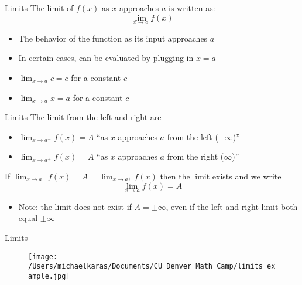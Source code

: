 \documentclass[aspectratio=169]{beamer}
\begin{document}
\begin{frame}{Limits}\label{main1}
	The limit of \( f(x) \) as \( x \) approaches \( a \) is written as:
\[
\lim_{x \to a} f(x)
\]
\begin{itemize}
\begin{itemize}
	\item The behavior of the function as its input approaches \( a \)
	\item In certain cases, can be evaluated by plugging in \( x = a \)
	\item \( \lim_{x \to a} c = c \) for a constant \( c \)
	\item \(\lim_{x \to a} x = a \) for a constant \( c \)
\end{itemize}
\end{itemize}

\end{frame}

\begin{frame}{Limits}\label{main1}
The limit from the left and right are
\begin{itemize}
\begin{itemize}
    \item \(\lim_{x \to a^-} f(x) = A\) “as \(x\) approaches \(a\) from the left (\(-\infty\))”
    \item \(\lim_{x \to a^+} f(x) = A\) “as \(x\) approaches \(a\) from the right (\(\infty\))”
\end{itemize}
\end{itemize}
If \(\lim_{x \to a^-} f(x) = A = \lim_{x \to a^+} f(x)\) then the limit exists and we write
\[
\lim_{x \to a} f(x) = A
\]
\begin{itemize}
    \item Note: the limit does not exist if \(A = \pm\infty\), even if the left and right limit both equal \(\pm\infty\)
\end{itemize}
\end{frame}

\begin{frame}{Limits}\label{main1}
    \begin{figure}
        \centering
        \texttt{[image: /Users/michaelkaras/Documents/CU\_Denver\_Math\_Camp/limits\_example.jpg]}
    \end{figure}
\end{frame}
\end{document}
